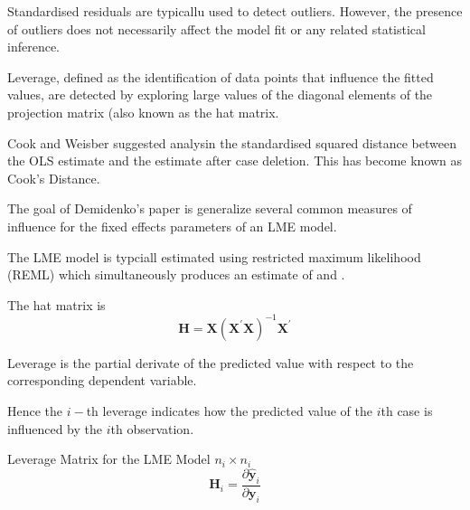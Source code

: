 
Standardised residuals are typicallu used to detect outliers. However, the presence of outliers does not necessarily affect the model fit or any related statistical inference.

Leverage, defined as the identification of data points that influence the fitted values, are detected by exploring large values of the diagonal elements of the projection matrix (also known as the hat matrix.

Cook and Weisber suggested analysin the standardised squared distance between the OLS estimate and the estimate after case deletion. This has become known as Cook's Distance.

The goal of Demidenko's paper is generalize several common measures of influence for the fixed effects parameters of an LME model.



The LME model is typciall estimated using restricted maximum likelihood (REML) which simultaneously produces an estimate of  and \boldsymbol{\beta}.
 
The hat matrix is 
\[\boldsymbol{H}  =  \boldsymbol{X} (\boldsymbol{X}^{\prime}\boldsymbol{X})^{-1}\boldsymbol{X} ^{\prime} \]

Leverage is the partial derivate of  the predicted value with respect to the corresponding dependent variable.

Hence the $i-$th leverage indicates how the predicted value of the $i$th case is influenced by the $i$th observation.


Leverage Matrix  for the LME Model $n_i \times n_i$
\[ \boldsymbol{H}_i = \frac{ \partial \hat{\boldsymbol{y}}_i } {\partial \boldsymbol{y}_i } \]
